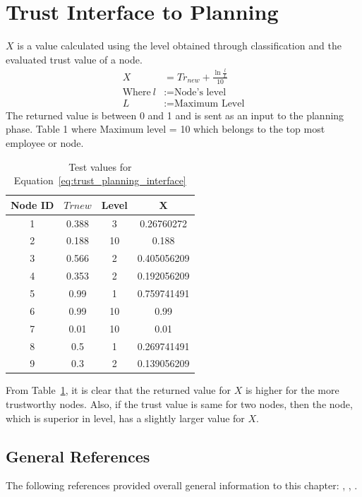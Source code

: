 \section{Trust Interface to Planning}
\( X \) is a value calculated using the level obtained through classification and the evaluated trust value of a node.
\begin{equation}
    \label{eq:trust_planning_interface}
    \begin{aligned}
        X &= Tr_{new} + \frac{\ln \frac{l}{L}}{10} \\
    \text{Where}~l &:= \text{Node's level} \\
    L &:= \text{Maximum Level}
    \end{aligned}
\end{equation}
The returned value is between 0 and 1 and is sent as an input to the planning phase.
Table 1 where Maximum level = 10 which belongs to the top most employee or node.
\begin{table}[h!]
    \centering
    \begin{tabular}{c | c | c | c}
        \hline
        Node ID	 & \( Tr{new} \) &	Level &	X \\
\hline \hline
1 &	0.388 &	3	 & 0.26760272 \\
2 &	0.188 &	10	 & 0.188 \\
3 &	0.566 &	2	 & 0.405056209 \\
4 &	0.353 &	2	 & 0.192056209 \\
5 &	0.99  &   1	 & 0.759741491 \\
6 &	0.99  &   10 & 	0.99 \\
7 &	0.01  &   10 & 	0.01 \\
8 &	0.5	  &   1	 & 0.269741491 \\
9 &	0.3	  &   2	 & 0.139056209 \\
\end{tabular}
\caption{Test values for Equation~\ref{eq:trust_planning_interface}}
\label{tab:trust_planning}
\end{table}

From Table~\ref{tab:trust_planning}, it is clear that the returned value for
\( X \) is higher for the more trustworthy nodes. Also, if the trust value is same for
two nodes, then the node, which is superior in level, has a slightly larger
value for \( X \).

\subsection{General References}
The following references provided overall general information to this chapter:
\autocite{JiminLi2010}, \autocite{Varadharajan2004},
\autocite{Varadharajan2005}.

